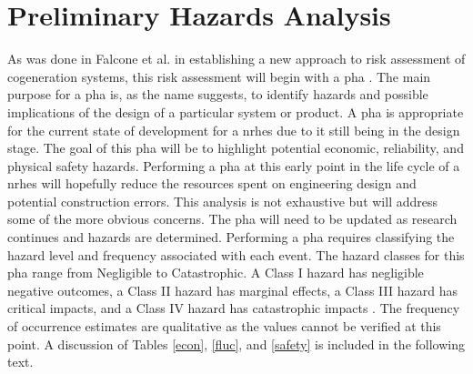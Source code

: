 \section{Preliminary Hazards Analysis}
As was done in Falcone et al. in establishing a new approach to risk assessment of cogeneration systems, this risk assessment will begin with a \ac{pha} \cite{Falcone}. The main purpose for a \ac{pha} is, as the name suggests, to identify hazards and possible implications of the design of a particular system or product.  A \ac{pha} is appropriate for the current state of development for a \ac{nrhes} due to it still being in the design stage. The goal of this \ac{pha} will be to highlight potential economic, reliability, and physical safety hazards. Performing a \ac{pha} at this early point in the life cycle of a \ac{nrhes} will hopefully reduce the resources spent on engineering design and potential construction errors. This analysis is not exhaustive but will address some of the more obvious concerns. The \ac{pha} will need to be updated as research continues and hazards are determined.
	Performing a \ac{pha} requires classifying the hazard level and frequency associated with each event. The hazard classes for this \ac{pha} range from Negligible to Catastrophic. A Class I hazard has negligible negative outcomes, a Class II hazard has marginal effects, a Class III hazard has critical impacts, and a Class IV hazard has catastrophic impacts \cite{ostrom2012risk}.  The frequency of occurrence estimates are qualitative as the values cannot be verified at this point. A discussion of Tables \ref{econ}, \ref{fluc}, and \ref{safety} is included in the following text.

